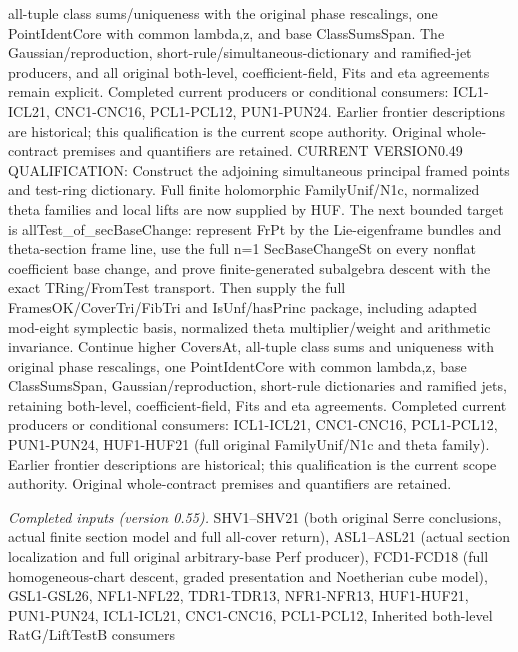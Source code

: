 \documentclass[11pt,a4paper]{article}
\numberwithin{equation}{section}
\theoremstyle{remark}\newtheorem{remark}[theorem]{Remark}
\begin{document}
all-tuple class sums/uniqueness with the original phase rescalings, one PointIdentCore with common lambda,z, and base ClassSumsSpan. The Gaussian/reproduction, short-rule/simultaneous-dictionary and ramified-jet producers, and all original both-level, coefficient-field, Fits and eta agreements remain explicit. Completed current producers or conditional consumers: ICL1-ICL21, CNC1-CNC16, PCL1-PCL12, PUN1-PUN24. Earlier frontier descriptions are historical; this qualification is the current scope authority. Original whole-contract premises and quantifiers are retained. CURRENT VERSION0.49 QUALIFICATION: Construct the adjoining simultaneous principal framed points and test-ring dictionary. Full finite holomorphic FamilyUnif/N1c, normalized theta families and local lifts are now supplied by HUF. The next bounded target is allTest\_\allowbreak of\_\allowbreak secBaseChange: represent FrPt by the Lie-eigenframe bundles and theta-section frame line, use the full n=1 SecBaseChangeSt on every nonflat coefficient base change, and prove finite-generated subalgebra descent with the exact TRing/FromTest transport. Then supply the full FramesOK/CoverTri/FibTri and IsUnf/hasPrinc package, including adapted mod-eight symplectic basis, normalized theta multiplier/weight and arithmetic invariance. Continue higher CoversAt, all-tuple class sums and uniqueness with original phase rescalings, one PointIdentCore with common lambda,z, base ClassSumsSpan, Gaussian/reproduction, short-rule dictionaries and ramified jets, retaining both-level, coefficient-field, Fits and eta agreements. Completed current producers or conditional consumers: ICL1-ICL21, CNC1-CNC16, PCL1-PCL12, PUN1-PUN24, HUF1-HUF21 (full original FamilyUnif/N1c and theta family). Earlier frontier descriptions are historical; this qualification is the current scope authority. Original whole-contract premises and quantifiers are retained.

\emph{Completed inputs (version 0.55).} SHV1–SHV21 (both original Serre conclusions, actual finite section model and full all-cover return), ASL1–ASL21 (actual section localization and full original arbitrary-base Perf producer), FCD1-FCD18 (full homogeneous-chart descent, graded presentation and Noetherian cube model), GSL1-GSL26, NFL1-NFL22, TDR1-TDR13, NFR1-NFR13, HUF1-HUF21, PUN1-PUN24, ICL1-ICL21, CNC1-CNC16, PCL1-PCL12, Inherited both-level RatG/LiftTestB consumers
\end{document}
